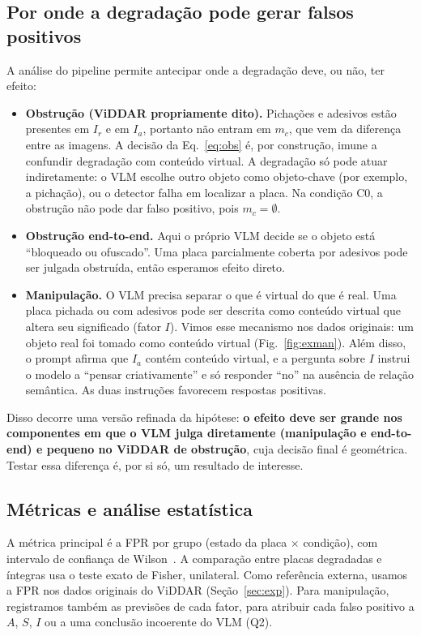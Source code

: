 \documentclass[journal,onecolumn]{IEEEtran}
\newcommand{\Ir}{I_r}
\newcommand{\Ia}{I_a}
\begin{document}
\subsection{Por onde a degradação pode gerar falsos positivos}
A análise do pipeline permite antecipar onde a degradação deve, ou não, ter efeito:
\begin{itemize}
\item \textbf{Obstrução (ViDDAR propriamente dito).} Pichações e adesivos estão presentes em $\Ir$ e
  em $\Ia$, portanto não entram em $m_c$, que vem da diferença entre as imagens. A decisão da
  Eq.~\eqref{eq:obs} é, por construção, imune a confundir degradação com conteúdo virtual. A
  degradação só pode atuar indiretamente: o VLM escolhe outro objeto como objeto-chave (por exemplo,
  a pichação), ou o detector falha em localizar a placa. Na condição C0, a obstrução não pode dar
  falso positivo, pois $m_c=\emptyset$.
\item \textbf{Obstrução end-to-end.} Aqui o próprio VLM decide se o objeto está ``bloqueado ou
  ofuscado''. Uma placa parcialmente coberta por adesivos pode ser julgada obstruída, então esperamos
  efeito direto.
\item \textbf{Manipulação.} O VLM precisa separar o que é virtual do que é real. Uma placa pichada ou
  com adesivos pode ser descrita como conteúdo virtual que altera seu significado (fator $I$). Vimos
  esse mecanismo nos dados originais: um objeto real foi tomado como conteúdo virtual
  (Fig.~\ref{fig:exman}). Além disso, o prompt afirma que $\Ia$ contém conteúdo virtual, e a pergunta
  sobre $I$ instrui o modelo a ``pensar criativamente'' e só responder ``no'' na ausência de relação
  semântica. As duas instruções favorecem respostas positivas.
\end{itemize}
Disso decorre uma versão refinada da hipótese: \textbf{o efeito deve ser grande nos componentes em
que o VLM julga diretamente (manipulação e end-to-end) e pequeno no ViDDAR de obstrução}, cuja decisão
final é geométrica. Testar essa diferença é, por si só, um resultado de interesse.

\subsection{Métricas e análise estatística}
A métrica principal é a FPR por grupo (estado da placa $\times$ condição), com intervalo de confiança
de Wilson~\cite{wilson}. A comparação entre placas degradadas e íntegras usa o teste exato de Fisher,
unilateral. Como referência externa, usamos a FPR nos dados originais do ViDDAR
(Seção~\ref{sec:exp}). Para manipulação, registramos também as previsões de cada fator, para atribuir
cada falso positivo a $A$, $S$, $I$ ou a uma conclusão incoerente do VLM (Q2).
\end{document}
